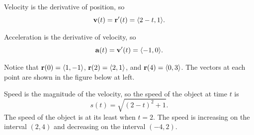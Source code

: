 \begin{activitySolution}
   \ba
    \item Velocity is the derivative of position, so
\[\mathbf{v}(t) = \mathbf{r}'(t)= \langle 2-t, 1 \rangle.\]


    \item Acceleration is the derivative of velocity, so
\[\mathbf{a}(t) = \mathbf{v}'(t)= \langle -1, 0 \rangle.\]

    \item Notice that $\mathbf{r}(0) = \langle 1,-1 \rangle$, $\mathbf{r}(2) = \langle 2,1 \rangle$, and $\mathbf{r}(4) = \langle 0,3 \rangle$. The vectors at each point are shown in the figure below at left. 


    \item Speed is the magnitude of the velocity, so the speed of the object at time $t$ is
\[s(t) = \sqrt{(2-t)^2+1}.\]
The speed of the object is at its least when $t=2$. The speed is increasing on the interval $(2,4)$ and decreasing on the interval $(-4,2)$.  
\begin{center}

\end{center}
\end{activitySolution}

